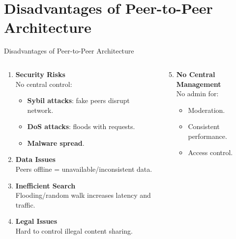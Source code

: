 \documentclass[aspectratio=169, table]{beamer}
\begin{document}
\section{Disadvantages of Peer-to-Peer Architecture}

\begin{frame}{Disadvantages of Peer-to-Peer Architecture}
	\begin{columns}[t]
		
		\begin{column}{0.5\textwidth}
			\begin{enumerate}
				\item \textbf{Security Risks} \\
				No central control:
				\begin{itemize}
					\item \textbf{Sybil attacks}: fake peers disrupt network.
					\item \textbf{DoS attacks}: floods with requests.
					\item \textbf{Malware spread}.
				\end{itemize}
				
				\item \textbf{Data Issues} \\
				Peers offline = unavailable/inconsistent data.
				
				\item \textbf{Inefficient Search} \\
				Flooding/random walk increases latency and traffic.
				
				\item \textbf{Legal Issues} \\
				Hard to control illegal content sharing.
			\end{enumerate}
		\end{column}
		
		\begin{column}{0.5\textwidth}
			\begin{enumerate}
				\setcounter{enumi}{4}
				
				
				
				\item \textbf{No Central Management} \\
				No admin for:
				\begin{itemize}
					\item Moderation.
					\item Consistent performance.
					\item Access control.
				\end{itemize}
				

\end{enumerate}
\end{column}
\end{columns}
\end{frame}
\end{document}
